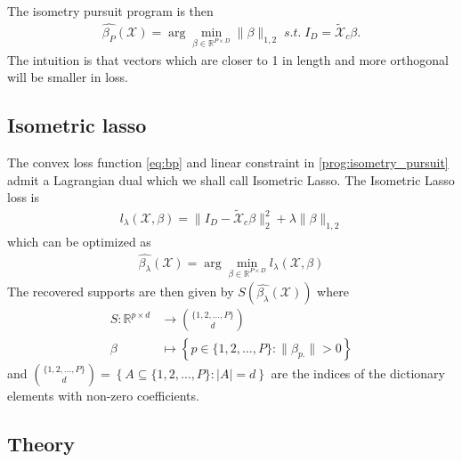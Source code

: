 The isometry pursuit program is then
\begin{align}
\label{prog:isometry_pursuit}
\hat {\beta_{P}} (\mathcal X)  = \arg \min_{\beta \in \mathbb R^{P \times D}} \| \beta \|_{1,2} \; s.t. \; I_D = \tilde{ \mathcal X}_c \beta.
\end{align}
The intuition is that vectors which are closer to 1 in length and more orthogonal will be smaller in loss.



\subsection{Isometric lasso}

The convex loss function \ref{eq:bp} and linear constraint in \ref{prog:isometry_pursuit} admit a Lagrangian dual which we shall call Isometric Lasso.
The Isometric Lasso loss is
\begin{align}
l_\lambda (\mathcal X, \beta) =  \|I_D -  \tilde{ \mathcal X}_c \beta\|_2^2 +  \lambda \| \beta \|_{1,2}
\end{align}
which can be optimized as
\begin{align}
\label{prog:isometric_lasso}
\hat {\beta_{\lambda}} (\mathcal X) = \arg \min_{\beta \in \mathbb R^{P \times D}} l_\lambda (\mathcal X, \beta)
\end{align}
The recovered supports are then given by $S(\hat {\beta_{\lambda}} (\mathcal X))$ where 
\begin{align}
S: \mathbb{R}^{p \times d} &\to \binom{\{1, 2, \ldots, P\}}{d} \\
\beta &\mapsto \left\{ p \in \{1, 2, \ldots, P\} :  \|\beta_{p.}\| > 0 \right\}
\end{align}
and $\binom{\{1, 2, \ldots, P\}}{d} = \left\{ A \subseteq \{1, 2, \ldots, P\} : \left|A\right| = d \right\}$ are the indices of the dictionary elements with non-zero coefficients.

\subsection{Theory}
\label{sec:theory}

